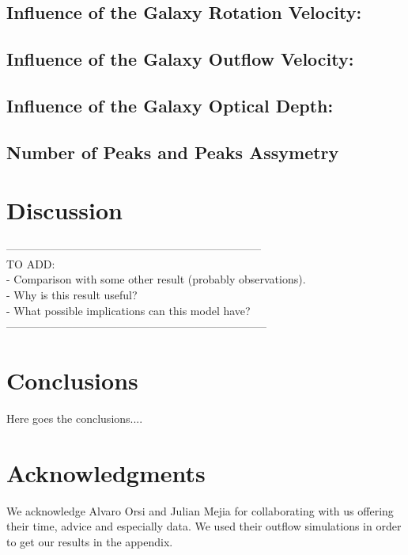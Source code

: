 \documentclass{latex/emulateapj}
\begin{document}
\subsection{Influence of the Galaxy Rotation Velocity: \vrot}


\subsection{Influence of the Galaxy Outflow Velocity: \vout}


\subsection{Influence of the Galaxy Optical Depth: \tauh}


\subsection{Number of Peaks and Peaks Assymetry}


\section{Discussion}
\label{sec:discussion}

---------------------------------------------------------------------\\
TO ADD: \\
- Comparison with some other result (probably observations).\\
- Why is this result useful? \\
- What possible implications can this model have?\\
-----------------------------------------------------------------------\\

\section{Conclusions}
\label{sec:conclusions}
Here goes the conclusions....

\section*{Acknowledgments}

We acknowledge Alvaro Orsi and Julian Mejia for collaborating with us offering their time, advice and especially data. We used their outflow simulations in order to get our results in the appendix.\\
\end{document}
